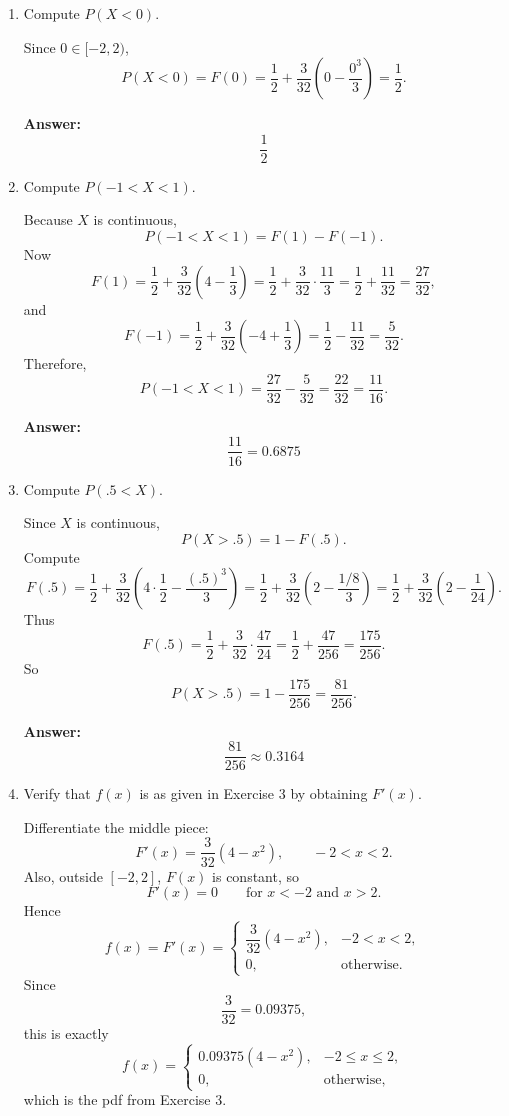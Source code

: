 \documentclass[11pt]{article}
\begin{document}
\begin{enumerate}
    \item[(a)] Compute \(P(X<0)\).

    Since \(0\in[-2,2)\),
    \[
    P(X<0)=F(0)=\frac12+\frac{3}{32}\left(0-\frac{0^3}{3}\right)=\frac12.
    \]

    \textbf{Answer:}
    \[
    \boxed{\frac12}
    \]

    \item[(b)] Compute \(P(-1<X<1)\).

    Because \(X\) is continuous,
    \[
    P(-1<X<1)=F(1)-F(-1).
    \]
    Now
    \[
    F(1)=\frac12+\frac{3}{32}\left(4-\frac13\right)
    =\frac12+\frac{3}{32}\cdot\frac{11}{3}
    =\frac12+\frac{11}{32}
    =\frac{27}{32},
    \]
    and
    \[
    F(-1)=\frac12+\frac{3}{32}\left(-4+\frac13\right)
    =\frac12-\frac{11}{32}
    =\frac{5}{32}.
    \]
    Therefore,
    \[
    P(-1<X<1)=\frac{27}{32}-\frac{5}{32}=\frac{22}{32}=\frac{11}{16}.
    \]

    \textbf{Answer:}
    \[
    \boxed{\frac{11}{16}=0.6875}
    \]

    \item[(c)] Compute \(P(.5<X)\).

    Since \(X\) is continuous,
    \[
    P(X>.5)=1-F(.5).
    \]
    Compute
    \[
    F(.5)=\frac12+\frac{3}{32}\left(4\cdot \frac12-\frac{(.5)^3}{3}\right)
    =\frac12+\frac{3}{32}\left(2-\frac{1/8}{3}\right)
    =\frac12+\frac{3}{32}\left(2-\frac{1}{24}\right).
    \]
    Thus
    \[
    F(.5)=\frac12+\frac{3}{32}\cdot \frac{47}{24}
    =\frac12+\frac{47}{256}
    =\frac{175}{256}.
    \]
    So
    \[
    P(X>.5)=1-\frac{175}{256}=\frac{81}{256}.
    \]

    \textbf{Answer:}
    \[
    \boxed{\frac{81}{256}\approx 0.3164}
    \]

    \item[(d)] Verify that \(f(x)\) is as given in Exercise 3 by obtaining \(F'(x)\).

    Differentiate the middle piece:
    \[
    F'(x)=\frac{3}{32}\left(4-x^2\right), \qquad -2<x<2.
    \]
    Also, outside \([-2,2]\), \(F(x)\) is constant, so
    \[
    F'(x)=0 \qquad \text{for } x<-2 \text{ and } x>2.
    \]
    Hence
    \[
    f(x)=F'(x)=
    \begin{cases}
    \dfrac{3}{32}(4-x^2), & -2<x<2,\\[6pt]
    0, & \text{otherwise.}
    \end{cases}
    \]
    Since
    \[
    \frac{3}{32}=0.09375,
    \]
    this is exactly
    \[
    f(x)=
    \begin{cases}
    0.09375(4-x^2), & -2\le x\le 2,\\
    0, & \text{otherwise,}
    \end{cases}
    \]
    which is the pdf from Exercise 3.


\end{enumerate}
\end{document}
